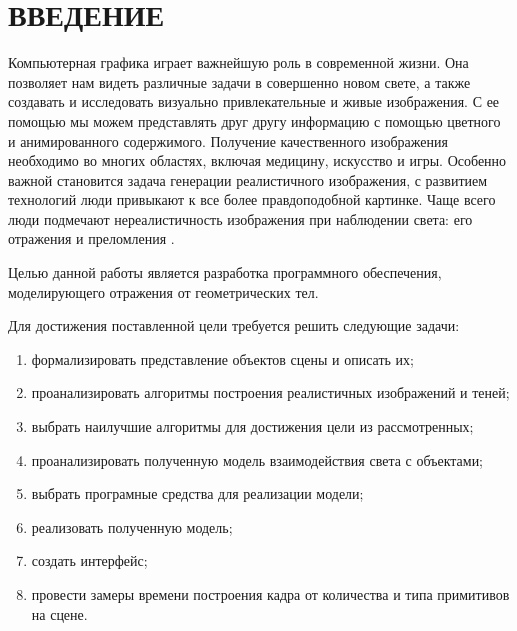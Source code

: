 \chapter*{ВВЕДЕНИЕ}

Компьютерная графика играет важнейшую роль в современной жизни. 
Она позволяет нам видеть различные задачи в совершенно новом свете, а также создавать и исследовать визуально привлекательные и живые изображения.
С ее помощью мы можем представлять друг другу информацию с помощью цветного и анимированного содержимого. 
Получение качественного изображения необходимо во многих областях, включая медицину, искусство и игры.
Особенно важной становится задача генерации реалистичного изображения, с развитием технологий люди привыкают к все более
правдоподобной картинке. Чаще всего люди подмечают нереалистичность изображения при наблюдении света: его отражения и преломления \cite{compgraph_usage}.


Целью данной работы является разработка программного обеспечения, моделирующего отражения от геометрических тел.

Для достижения поставленной цели требуется решить следующие задачи:
\begin{enumerate}
	\item формализировать представление объектов сцены и описать их;
	\item проанализировать алгоритмы построения реалистичных изображений и теней;
	\item выбрать наилучшие алгоритмы для достижения цели  из рассмотренных;
	\item проанализировать полученную  модель взаимодействия света с объектами;
	\item выбрать програмные средства для реализации модели;
	\item реализовать полученную модель;
	\item создать интерфейс;
	\item провести замеры времени построения кадра от количества и типа примитивов на сцене.
\end{enumerate}
